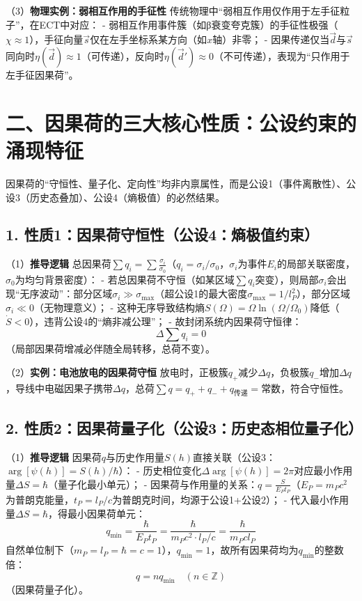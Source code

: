 \documentclass{article}
\begin{document}
（3）\textbf{物理实例：弱相互作用的手征性}  
传统物理中“弱相互作用仅作用于左手征粒子”，在ECT中对应：  
- 弱相互作用事件簇（如β衰变夸克簇）的手征性极强（\(\chi \approx 1\)），手征向量\(\vec{s}\)仅在左手坐标系某方向（如\(x\)轴）非零；  
- 因果传递仅当\(\vec{d}\)与\(\vec{s}\)同向时\(\eta(\vec{d}) \approx 1\)（可传递），反向时\(\eta(\vec{d}') \approx 0\)（不可传递），表现为“只作用于左手征因果荷”。


\section*{二、因果荷的三大核心性质：公设约束的涌现特征}
因果荷的“守恒性、量子化、定向性”均非内禀属性，而是公设1（事件离散性）、公设3（历史态叠加）、公设4（熵极值）的必然结果。

\subsection*{1. 性质1：因果荷守恒性（公设4：熵极值约束）}
（1）\textbf{推导逻辑}  
总因果荷\(\sum q_i = \sum \frac{\sigma_i}{\sigma_0}\)（\(q_i = \sigma_i/\sigma_0\)，\(\sigma_i\)为事件\(E_i\)的局部关联密度，\(\sigma_0\)为均匀背景密度）：  
- 若总因果荷不守恒（如某区域\(\sum q_i\)突变），则局部\(\sigma_i\)会出现“无序波动”：部分区域\(\sigma_i \gg \sigma_{\text{max}}\)（超公设1的最大密度\(\sigma_{\text{max}} = 1/l_P^2\)），部分区域\(\sigma_i \ll 0\)（无物理意义）；  
- 这种无序导致结构熵\(S(\Omega) = \Omega \ln(\Omega/\Omega_0)\)降低（\(\dot{S} < 0\)），违背公设4的“熵非减公理”；  
- 故封闭系统内因果荷守恒律：
\[
\boxed{\Delta \sum q_i = 0}
\]
（局部因果荷增减必伴随全局转移，总荷不变）。

（2）\textbf{实例：电池放电的因果荷守恒}  
放电时，正极簇\(q_+\)减少\(\Delta q\)，负极簇\(q_-\)增加\(\Delta q\)，导线中电磁因果子携带\(\Delta q\)，总荷\(\sum q = q_+ + q_- + q_{\text{传递}} = \text{常数}\)，符合守恒性。

\subsection*{2. 性质2：因果荷量子化（公设3：历史态相位量子化）}
（1）\textbf{推导逻辑}  
因果荷\(q\)与历史作用量\(S(h)\)直接关联（公设3：\(\arg[\psi(h)] = S(h)/\hbar\)）：  
- 历史相位变化\(\Delta \arg[\psi(h)] = 2\pi\)对应最小作用量\(\Delta S = \hbar\)（量子化最小单元）；  
- 因果荷与作用量的关系：\(q = \frac{S}{E_P t_P}\)（\(E_P = m_P c^2\)为普朗克能量，\(t_P = l_P/c\)为普朗克时间，均源于公设1+公设2）；  
- 代入最小作用量\(\Delta S = \hbar\)，得最小因果荷单元：
\[
q_{\text{min}} = \frac{\hbar}{E_P t_P} = \frac{\hbar}{m_P c^2 \cdot l_P/c} = \frac{\hbar}{m_P c l_P}
\]
自然单位制下（\(m_P = l_P = \hbar = c = 1\)），\(q_{\text{min}} = 1\)，故所有因果荷均为\(q_{\text{min}}\)的整数倍：
\[
\boxed{q = n q_{\text{min}} \quad (n \in \mathbb{Z})}
\]
（因果荷量子化）。
\end{document}
